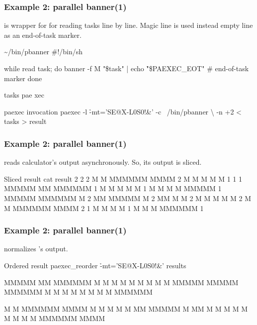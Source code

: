 \documentclass[hyperref={colorlinks=true}]{beamer}
\begin{document}
\begin{frame}[fragile]
  \frametitle{Example 2: parallel banner(1)}
 is wrapper for  for reading tasks line by line.
Magic line is used instead empty line as an end-of-task marker.
  \begin{block}{}
      \begin{Code}{\~{}/bin/pbanner}
#!/bin/sh

while read task; do
   banner -f M "\$task" |
   echo \h{"\$PAEXEC\_EOT"} # end-of-task marker
done
      \end{Code}
      \begin{Code}{tasks}
pae
xec
      \end{Code}

      \begin{Code}{paexec invocation}
\prompt{\$} paexec -l \h{-mt='SE@X-L0S0!&'} -c ~/bin/pbanner \textbackslash
   -n +2 < tasks > result
\prompt{\$}
      \end{Code}
  \end{block}
\end{frame}

\linespread{0.5}
\begin{frame}[fragile]
  \frametitle{Example 2: parallel banner(1)}
 reads calculator's output asynchronously.
So, its output is sliced.
  \begin{block}{}
      \begin{CodeSmall}{Sliced result}
\prompt{\$} cat result
2 
2 
2  M    M  MMMMMM   MMMM
2   M  M   M       M    M
1 
1 
1  MMMMM     MM    MMMMMM
1  M    M   M  M   M
1  M    M  M    M  MMMMM
1  MMMMM   MMMMMM  M
2    MM    MMMMM   M
2    MM    M       M
2   M  M   M       M    M
2  M    M  MMMMMM   MMMM
2 
1  M       M    M  M
1  M       M    M  MMMMMM
1 
\prompt{\$}
      \end{CodeSmall}
  \end{block}
\end{frame}
\linespread{1}

\linespread{0.5}
\begin{frame}[fragile]
  \frametitle{Example 2: parallel banner(1)}
 normalizes 's output.
  \begin{block}{}
      \begin{CodeSmall}{Ordered result}
\prompt{\$} paexec_reorder \h{-mt='SE@X-L0S0!&'} results


MMMMM     MM    MMMMMM
M    M   M  M   M
M    M  M    M  MMMMM
MMMMM   MMMMMM  M
M       M    M  M
M       M    M  MMMMMM



M    M  MMMMMM   MMMM
 M  M   M       M    M
  MM    MMMMM   M
  MM    M       M
 M  M   M       M    M
M    M  MMMMMM   MMMM


\prompt{\$}
      \end{CodeSmall}
  \end{block}
\end{frame}
\linespread{1}
\end{document}
